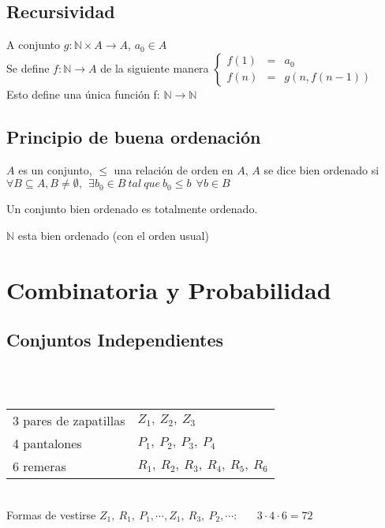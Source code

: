 \documentclass[a4paper,10pt]{article}
\begin{document}
\subsection {Recursividad}


 A conjunto $g: \mathbb{N} \times A \longrightarrow A$, $a_0 \in A$ \\
Se define $f: \mathbb{N} \longrightarrow A$ de la siguiente manera
$\left\{
\begin{array}{rcl}
     f(1) & = & a_0
  \\ f(n) & = & g(n,f(n-1))
\end{array}
\right.$ \\
Esto define una única función f: $\mathbb{N} \longrightarrow \mathbb{N}$


\subsection {Principio de buena ordenación}


 $A$ es un conjunto, $\leq$ una relación de orden en $A$, $A$ se dice bien ordenado si $\forall B \subseteq A, B \neq \emptyset, \ \ \exists b_0 \in B \ tal \ que \ b_0 \leq b \ \ \forall b \in B$  

\propiedad Un conjunto bien ordenado es totalmente ordenado.

\teorema $\mathbb{N}$ esta bien ordenado (con el orden usual)



\section{Combinatoria y Probabilidad}




\subsection{Conjuntos Independientes}


\ejemplo \\ \\
\begin{tabular}{ l  l }
   3 pares de zapatillas & $Z_1,\ Z_2,\ Z_3$
   \\ 4 pantalones & $P_1,\ P_2,\ P_3,\ P_4$
   \\ 6 remeras & $R_1,\ R_2,\ R_3,\ R_4,\ R_5,\ R_6$
 \end{tabular} \\

Formas de vestirse $Z_1,\ R_1,\ P_1,\cdots,Z_1,\ R_3,\ P_2,\cdots$: \ \ \  $3 \cdot 4 \cdot 6 = 72$
\end{document}
